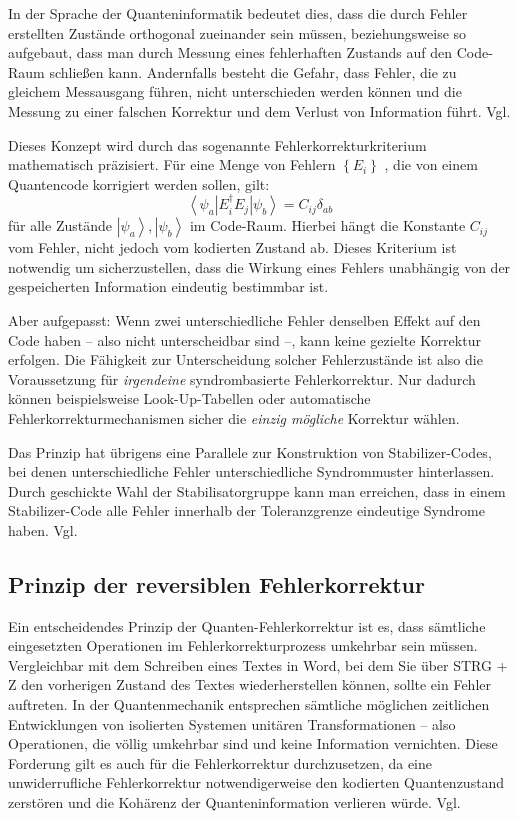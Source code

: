 In der Sprache der Quanteninformatik bedeutet dies, dass die durch Fehler erstellten Zustände orthogonal zueinander sein müssen, beziehungsweise so aufgebaut, dass man durch Messung eines fehlerhaften Zustands auf den Code-Raum schließen kann. Andernfalls besteht die Gefahr, dass Fehler, die zu gleichem Messausgang führen, nicht unterschieden werden können und die Messung zu einer falschen Korrektur und dem Verlust von Information führt. Vgl. \cite[Seite 449–451]{nielsen_quantum_2010}

Dieses Konzept wird durch das sogenannte Fehlerkorrekturkriterium mathematisch präzisiert. Für eine Menge von Fehlern \(\left\{E_{i}\right\}\) , die von einem Quantencode korrigiert werden sollen, gilt:
\begin{equation}
    \left\langle\psi_{a}\right| E_{i}^{\dagger} E_{j}\left|\psi_{b}\right\rangle=C_{i j} \delta_{a b}
\end{equation}
für alle Zustände \(
    \left|\psi_{a}\right\rangle,\left|\psi_{b}\right\rangle
\)  im Code-Raum. Hierbei hängt die Konstante \(
    C_{i j}
\) vom Fehler,  nicht jedoch vom kodierten Zustand ab. Dieses Kriterium ist notwendig um sicherzustellen, dass die Wirkung eines Fehlers unabhängig von der gespeicherten Information eindeutig bestimmbar ist.

Aber aufgepasst: Wenn zwei unterschiedliche Fehler denselben Effekt auf den Code haben – also nicht unterscheidbar sind –, kann keine gezielte Korrektur erfolgen. Die Fähigkeit zur Unterscheidung solcher Fehlerzustände ist also die Voraussetzung für \textit{irgendeine} syndrombasierte Fehlerkorrektur. Nur dadurch können beispielsweise Look-Up-Tabellen oder automatische Fehlerkorrekturmechanismen sicher die \textit{einzig mögliche} Korrektur wählen.

Das Prinzip hat übrigens eine Parallele zur Konstruktion von Stabilizer-Codes, bei denen unterschiedliche Fehler unterschiedliche Syndrommuster hinterlassen. Durch geschickte Wahl der Stabilisatorgruppe kann man erreichen, dass in einem Stabilizer-Code alle Fehler innerhalb der Toleranzgrenze eindeutige Syndrome haben. Vgl. \cite{gottesman_stabilizer_1997}

\subsection{Prinzip der reversiblen Fehlerkorrektur}
Ein entscheidendes Prinzip der Quanten-Fehlerkorrektur ist es, dass sämtliche eingesetzten Operationen im Fehlerkorrekturprozess umkehrbar sein müssen. Vergleichbar mit dem Schreiben eines Textes in Word, bei dem Sie über STRG + Z den vorherigen Zustand des Textes wiederherstellen können, sollte ein Fehler auftreten.  In der Quantenmechanik entsprechen sämtliche möglichen zeitlichen Entwicklungen von isolierten Systemen unitären Transformationen – also Operationen, die völlig umkehrbar sind und keine Information vernichten. Diese Forderung gilt es auch für die Fehlerkorrektur durchzusetzen, da eine unwiderrufliche Fehlerkorrektur notwendigerweise den kodierten Quantenzustand zerstören und die Kohärenz der Quanteninformation verlieren würde. Vgl. \cite[Seite 450-451]{nielsen_quantum_2010}


